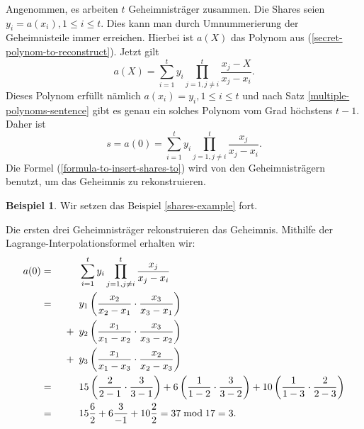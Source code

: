 \documentclass[12pt, a4paper, oneside, titlepage]{report}
\theoremstyle{definition}
\newtheorem{bsp}[lemma]{Beispiel}
\begin{document}
	Angenommen, es arbeiten $ t $ Geheimnisträger zusammen. Die Shares seien $ y_i = a(x_i), 1 \leq i \leq t $. Dies kann man durch Umnummerierung der Geheimnisteile immer erreichen. Hierbei ist $ a(X) $ das Polynom aus (\ref{secret-polynom-to-reconstruct}).  Jetzt gilt
	$$ a(X) = \sum_{i=1}^{t} y_i \prod_{j=1, j \neq i}^{t} \frac{x_j - X}{x_j - x_i} . $$
	Dieses Polynom erfüllt nämlich $ a(x_i) = y_i, 1 \leq i \leq t $ und nach Satz \ref{multiple-polynoms-sentence} gibt es genau ein solches Polynom vom Grad höchstens $ t - 1 $. Daher ist
	\begin{equation}\label{formula-to-insert-shares-to}
		s = a(0) = \sum_{i=1}^{t} y_i \prod_{j=1, j \neq i}^{t} \frac{x_j}{x_j - x_i} .
	\end{equation}
	Die Formel (\ref{formula-to-insert-shares-to}) wird von den Geheimnisträgern benutzt, um das Geheimnis zu rekonstruieren.
	\pagebreak
	\begin{bsp}
		Wir setzen das Beispiel \ref{shares-example} fort.

		Die ersten drei Geheimnisträger rekonstruieren das Geheimnis. Mithilfe der Lagrange-Interpolationsformel erhalten wir:
		\begin{alignat*}{3}
		a(0)
				= &&& \sum_{i=1}^{t} y_i \prod_{j=1, j \neq i}^{t} \frac{x_j}{x_j - x_i} \\
				= &&& y_1  \left( \frac{x_2}{x_2 - x_1} \cdot \frac{x_3}{x_3 - x_1} \right) \\
					&& \enskip + \enskip
						& y_2  \left( \frac{x_1}{x_1 - x_2} \cdot \frac{x_3}{x_3 - x_2} \right) \\
					&& \enskip + \enskip
						& y_3  \left( \frac{x_1}{x_1 - x_3} \cdot \frac{x_2}{x_2 - x_3} \right) \\
				= &&& 15 \left( \frac{2}{2 - 1} \cdot \frac{3}{3 - 1} \right) 
					+ 6 \left( \frac{1}{1 - 2} \cdot \frac{3}{3 - 2} \right) 
					+ 10 \left( \frac{1}{1 - 3} \cdot \frac{2}{2 - 3} \right)\\
				= &&& 15 \frac{6}{2} + 6 \frac{3}{-1} + 10 \frac{2}{2} = 37 \bmod 17 = 3.
		\end{alignat*}
	\end{bsp}
	
\end{document}
